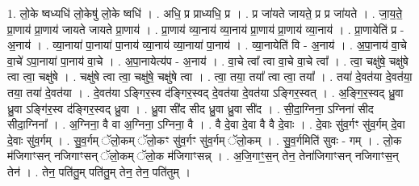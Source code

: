 \documentclass[17pt]{extarticle}
\begin{document}
1. लो॒के ष्वध्यधि॑ लो॒केषु॑ लो॒के ष्वधि॑ । . अधि॒ प्र प्राध्यधि॒ प्र । . प्र जा॑यते जायते॒ प्र प्र जा॑यते । . जा॒य॒ते॒ प्रा॒णाय॑ प्रा॒णाय॑ जायते जायते प्रा॒णाय॑ । . प्रा॒णाय॑ व्या॒नाय॑ व्या॒नाय॑ प्रा॒णाय॑ प्रा॒णाय॑ व्या॒नाय॑ । . प्रा॒णायेति॑ प्र - अ॒नाय॑ । . व्या॒नाया॑ पा॒नाया॑ पा॒नाय॑ व्या॒नाय॑ व्या॒नाया॑ पा॒नाय॑ । . व्या॒नायेति॑ वि - अ॒नाय॑ । . अ॒पा॒नाय॑ वा॒चे वा॒चे॑ ऽपा॒नाया॑ पा॒नाय॑ वा॒चे । . अ॒पा॒नायेत्य॑प - अ॒नाय॑ । . वा॒चे त्वा᳚ त्वा वा॒चे वा॒चे त्वा᳚ । . त्वा॒ चक्षु॑षे॒ चक्षु॑षे त्वा त्वा॒ चक्षु॑षे । . चक्षु॑षे त्वा त्वा॒ चक्षु॑षे॒ चक्षु॑षे त्वा । . त्वा॒ तया॒ तया᳚ त्वा त्वा॒ तया᳚ । . तया॑ दे॒वत॑या दे॒वत॑या॒ तया॒ तया॑ दे॒वत॑या । . दे॒वत॑या ऽङ्गिर॒स्व द॑ङ्गिर॒स्वद् दे॒वत॑या दे॒वत॑या ऽङ्गिर॒स्वत् । . अ॒ङ्गि॒र॒स्वद् ध्रु॒वा ध्रु॒वा ऽङ्गि॑र॒स्व द॑ङ्गिर॒स्वद् ध्रु॒वा । . ध्रु॒वा सी॑द सीद ध्रु॒वा ध्रु॒वा सी॑द । . सी॒दा॒ग्निना॒ ऽग्निना॑ सीद सीदा॒ग्निना᳚ । . अ॒ग्निना॒ वै वा अ॒ग्निना॒ ऽग्निना॒ वै । . वै दे॒वा दे॒वा वै वै दे॒वाः । . दे॒वाः सु॑व॒र्गꣳ सु॑व॒र्गम् दे॒वा दे॒वाः सु॑व॒र्गम् । . सु॒व॒र्गम् ॅलो॒कम् ॅलो॒कꣳ सु॑व॒र्गꣳ सु॑व॒र्गम् ॅलो॒कम् । . सु॒व॒र्गमिति॑ सुवः - गम् । . लो॒क म॑जिगाꣳसन् नजिगाꣳसन् ॅलो॒कम् ॅलो॒क म॑जिगाꣳसन्न् । . अ॒जि॒गाꣳ॒॒स॒न् तेन॒ तेना॑जिगाꣳसन् नजिगाꣳस॒न् तेन॑ । . तेन॒ पति॑तु॒म् पति॑तु॒म् तेन॒ तेन॒ पति॑तुम् । \newline
\end{document}
